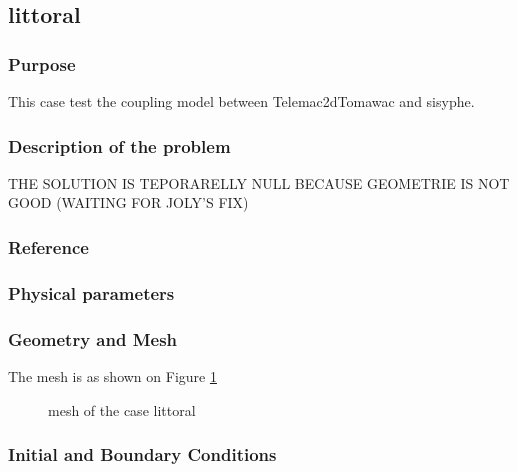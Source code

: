\subsection{littoral}
%

%
\subsubsection{Purpose}
%
This case test the coupling model between Telemac2dTomawac and sisyphe.
%
\subsubsection{Description of the problem}
%
THE SOLUTION IS TEPORARELLY NULL BECAUSE GEOMETRIE IS NOT GOOD (WAITING FOR JOLY'S FIX)
%
%
\subsubsection{Reference}
%

%
%
\subsubsection{Physical parameters}
%

%
%
\subsubsection{Geometry and Mesh}
%
The mesh is as shown on Figure \ref{littoralmesh}
\begin{figure} [!h]
\centering
{}
 \caption{mesh of the case littoral}
\label{littoralmesh}
\end{figure}

%
%
\subsubsection{Initial and Boundary Conditions}
%

